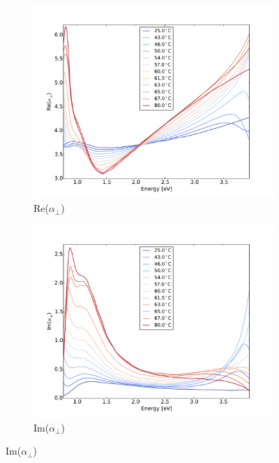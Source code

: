 %
%
\begin{figure}[h!]
    \centering
    \begin{subfigure}[b]{0.49\textwidth}
        \centering
        \includegraphics[width=\textwidth]{Results/Sim3/re_alpha_perp.pdf}
        \caption{Re($\alpha_{\perp}$)}
        \label{fig:}
    \end{subfigure}
    \begin{subfigure}[b]{0.49\textwidth}
        \centering
        \includegraphics[width=\textwidth]{Results/Sim3/im_alpha_perp.pdf}
        \caption{Im($\alpha_{\perp}$)}
        \label{fig:}
    \end{subfigure}

\end{figure}
